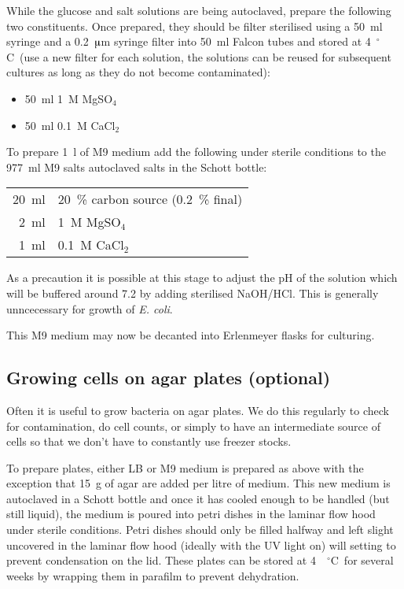 \documentclass[a4paper]{article}
\newcommand{\dc}{~$^{\circ}$C}
\newcommand{\ec}{\textit{E. coli}}
\newcommand{\micro}{$\muup$}
\begin{document}
\begin{multicols}{2}
While the glucose and salt solutions are being autoclaved, prepare the
following two constituents. Once prepared, they should be filter sterilised
using a 50~ml syringe and a 0.2~\micro m syringe filter into 50~ml
Falcon tubes and stored at 4\dc\ (use a new filter for each solution, the
solutions can be reused for subsequent cultures as long as they do not become
contaminated):

\begin{itemize}
\item 50~ml 1~M MgSO$_4$
\item 50~ml 0.1~M CaCl$_2$
\end{itemize}

To prepare 1~l of M9 medium add the following under sterile conditions to the
977~ml M9 salts autoclaved salts in the Schott bottle:

\begin{center}
\begin{tabular}[h]{rl} \toprule
20~ml   & 20~\% carbon source (0.2~\% final)\\
2~ml    & 1~M MgSO$_4$\\
1~ml    & 0.1~M CaCl$_2$\\ \bottomrule
\end{tabular}
\end{center}

As a precaution it is possible at this stage to adjust the pH of the solution
which will be buffered around 7.2 by adding sterilised NaOH/HCl. This is
generally unncecessary for growth of \ec.

This M9 medium may now be decanted into Erlenmeyer flasks for culturing.

\subsection{Growing cells on agar plates (optional)} 

Often it is useful to grow bacteria on agar plates.
We do this regularly to check for contamination, do cell counts, or simply to
have an intermediate source of cells so that we don't have to constantly use
freezer stocks.

To prepare plates, either LB or M9 medium is prepared as above with the
exception that 15~g of agar are added per litre of medium. This new medium is
autoclaved in a Schott bottle and once it has cooled enough to be handled (but
still liquid), the medium is poured into petri dishes in the laminar flow hood
under sterile conditions. Petri dishes should only be filled halfway and left
slight uncovered in the laminar flow hood (ideally with the UV light on) will
setting to prevent condensation on the lid. These plates can be stored at
4~\dc\ for several weeks by wrapping them in parafilm to prevent dehydration.


\end{multicols}
\end{document}
